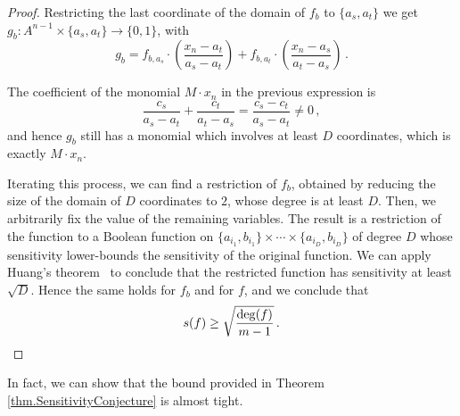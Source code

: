 \documentclass[a4paper,10pt]{amsart}
\begin{document}
\begin{proof}
Restricting the last coordinate of the domain of $f_b$ to $\{a_s, a_t\}$ we get $g_b\colon A^{n-1}\times\{a_s,a_t\}\rightarrow \{0,1\}$, with \[g_b=f_{b,a_s}\cdot\left(\frac{x_n-a_t}{a_s-a_t}\right)+f_{b,a_t}\cdot\left(\frac{x_n-a_s}{a_t-a_s}\right)\, .\]

The coefficient of the monomial $M\cdot x_n$ in the previous expression is \[\frac{c_s}{a_s-a_t}+\frac{c_t}{a_t-a_s}=\frac{c_s-c_t}{a_s-a_t}\neq 0\, ,\] and hence $g_b$ still has a monomial which involves at least $D$ coordinates, which is exactly $M\cdot x_n$. 

Iterating this process, we can find a restriction of $f_b$, obtained by reducing the size of the domain of $D$ coordinates to $2$, whose degree is at least $D$.  Then, we arbitrarily fix the value of the remaining variables. The result is a restriction of the function to a Boolean function on $\{a_{i_1},b_{i_1}\} \times \cdots \times \{a_{i_D},b_{i_D}\}$ of degree $D$ whose sensitivity lower-bounds the sensitivity of the original function.
We can apply Huang's theorem~\cite{H19} to conclude that the restricted function has sensitivity at least $\sqrt{D}$. Hence the same holds for $f_b$ and for $f$, and we conclude that
\[
 s(f) \geq \sqrt{\frac{\deg(f)}{m-1}}\, . \qedhere
\]\end{proof}

In fact, we can show that the bound provided in Theorem \ref{thm.SensitivityConjecture} is almost tight.
\end{document}
